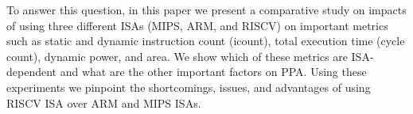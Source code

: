 To answer this question, in this paper we present a comparative study on impacts of using three different ISAs (MIPS, ARM, and RISCV) on important metrics such as static and dynamic instruction count (icount), total execution time (cycle count), dynamic power, and area. We show which of these metrics are ISA-dependent and what are the other important factors on PPA. Using these experiments we pinpoint the shortcomings, issues, and advantages of using RISCV ISA over ARM and MIPS ISAs. 


